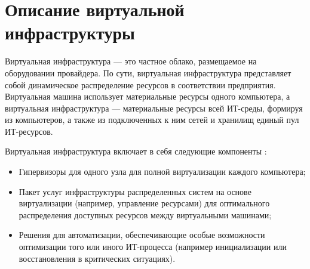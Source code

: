 \section{Описание виртуальной инфраструктуры}

\iffalse 
Пункты:?
\begin{itemize}
  \item Назначение
  \item Системные требования, парк серверов
  \item Технологии, ПО, библиотеки, скрипты
  \item Алгоритмы (несколько, они довольно сложные) функционирования инфраструктуры 
\end{itemize}

Ключевые слова:
виртуализация,
KVM,
OpenVZ,
выделенный сервер,
VPS,
мониторинг,
nagios,
munin,
резервное копирование,
полный/инкрементальный/дифференциальный бэкапы,
репликация MySQL,
репликация DNS,
шардинг,
CDN,
типы репликации DNS и MySQL,
DDoS и защита от него,
LVM,
RAID,
панель управления,
ISPmanager/Vesta/Plesk/cpanel/ajenti...,
ISPsystem и его продукция,
обоснование выбора OpenVZ и KVM,
работа с ДЦ,
лицензии на ПО и подсети IP с арендуемым железом,
биллинг (платежная система),
скрипты самопальные,
свои конфиги,
тестирование хостинг-панелей для клиентов,
клиентская и админская документация,
тарифы (услуги),
миграция контейнеров и серверов,
отказоустойчивость,
расширение инфраструктуры
\fi 

Виртуальная инфраструктура --- это частное облако, размещаемое на оборудовании провайдера.
По сути, виртуальная инфраструктура представляет собой динамическое распределение ресурсов в соответствии предприятия.
Виртуальная машина использует материальные ресурсы одного компьютера, а виртуальная инфраструктура --- материальные ресурсы всей ИТ-среды, формируя из компьютеров, а также из подключенных к ним сетей и хранилищ единый пул ИТ-ресурсов.

Виртуальная инфраструктура включает в себя следующие компоненты \cite{virt-infrast}:
\begin{itemize}
  \item Гипервизоры для одного узла для полной виртуализации каждого компьютера;
  \item Пакет услуг инфраструктуры распределенных систем на основе виртуализации (например, управление ресурсами) для оптимального распределения доступных ресурсов между виртуальными машинами;
  \item Решения для автоматизации, обеспечивающие особые возможности оптимизации того или иного ИТ-процесса (например инициализации или восстановления в критических ситуациях).
\end{itemize}

